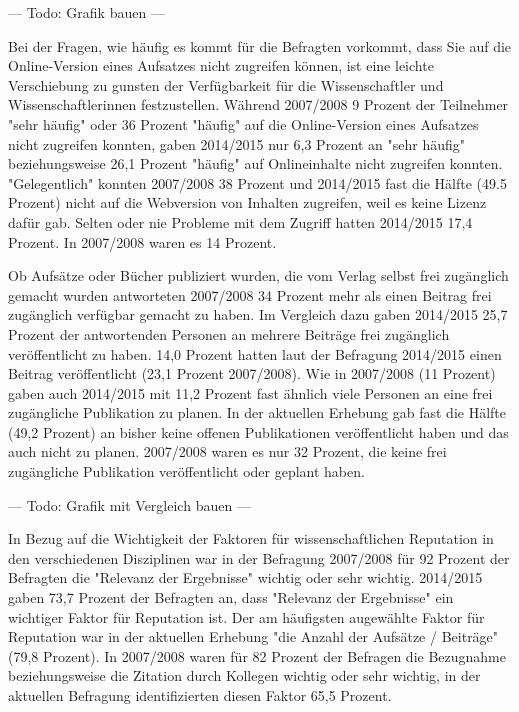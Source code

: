 --- Todo: Grafik bauen ---

Bei der Fragen, wie häufig es kommt für die Befragten vorkommt, dass Sie auf die Online-Version eines Aufsatzes nicht zugreifen können, ist eine leichte Verschiebung zu gunsten der Verfügbarkeit für die Wissenschaftler und Wissenschaftlerinnen festzustellen. Während 2007/2008 9 Prozent der Teilnehmer "sehr häufig" oder 36 Prozent "häufig" auf die Online-Version eines Aufsatzes nicht zugreifen konnten, gaben 2014/2015 nur 6,3 Prozent an "sehr häufig" beziehungsweise 26,1 Prozent "häufig" auf Onlineinhalte nicht zugreifen konnten. "Gelegentlich" konnten 2007/2008 38 Prozent und 2014/2015 fast die Hälfte (49.5 Prozent) nicht auf die Webversion von Inhalten zugreifen, weil es keine Lizenz dafür gab. Selten oder nie Probleme mit dem Zugriff hatten 2014/2015 17,4 Prozent. In 2007/2008 waren es 14 Prozent.

Ob Aufsätze oder Bücher publiziert wurden, die vom Verlag selbst frei zugänglich gemacht wurden antworteten 2007/2008 34 Prozent mehr als einen Beitrag frei zugänglich verfügbar gemacht zu haben. Im Vergleich dazu gaben 2014/2015 25,7 Prozent der antwortenden Personen an mehrere Beiträge frei zugänglich veröffentlicht zu haben. 14,0 Prozent hatten laut der Befragung 2014/2015 einen Beitrag veröffentlicht (23,1 Prozent 2007/2008). Wie in 2007/2008 (11 Prozent) gaben auch 2014/2015 mit 11,2 Prozent fast ähnlich viele Personen an eine frei zugängliche Publikation zu planen. In der aktuellen Erhebung gab fast die Hälfte (49,2 Prozent) an bisher keine offenen Publikationen veröffentlicht haben und das auch nicht zu planen. 2007/2008 waren es nur 32 Prozent, die keine frei zugängliche Publikation veröffentlicht oder geplant haben.

--- Todo: Grafik mit Vergleich bauen ---

In Bezug auf die Wichtigkeit der Faktoren für wissenschaftlichen Reputation in den verschiedenen Disziplinen war in der Befragung 2007/2008 für 92 Prozent der Befragten die "Relevanz der Ergebnisse" wichtig oder sehr wichtig. 2014/2015 gaben 73,7 Prozent der Befragten an, dass "Relevanz der Ergebnisse" ein wichtiger Faktor für Reputation ist. Der am häufigsten augewählte Faktor für Reputation war in der aktuellen Erhebung "die Anzahl der Aufsätze / Beiträge" (79,8 Prozent). In 2007/2008 waren für 82 Prozent der Befragen die Bezugnahme beziehungsweise die Zitation durch Kollegen wichtig oder sehr wichtig, in der aktuellen Befragung identifizierten diesen Faktor 65,5 Prozent.

